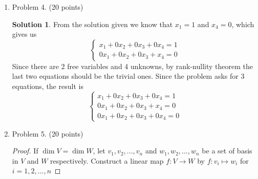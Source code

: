 \documentclass[]{book}
\theoremstyle{definition}
\newtheorem*{soln}{Solution}
\newcommand{\0}{\mathbf{0}}
\begin{document}
\begin{enumerate}
\item Problem 4. (20 points)
\begin{soln}
From the solution given we know that $x_1=1$ and $x_4=0$, which gives us
\begin{equation*}
\begin{cases}
x_1+0x_2+0x_3+0x_4=1\\
0x_1+0x_2+0x_3+x_4=0
\end{cases}
\end{equation*}
Since there are 2 free variables and 4 unknowns, by rank-nullity theorem the last two equations should be the trivial ones. Since the problem asks for 3 equations, the result is
\begin{equation*}
\begin{cases}
x_1+0x_2+0x_3+0x_4=1\\
0x_1+0x_2+0x_3+x_4=0\\
0x_1+0x_2+0x_3+0x_4=0
\end{cases}
\end{equation*}
\end{soln}

\item Problem 5. (20 points)
\begin{proof}
If $\dim V=\dim W$, let $v_1,v_2,...,v_n$ and $w_1,w_2,...,w_n$ be a set of basis in $V$ and $W$ respectively. Construct a linear map $f:V\to W$ by $f:v_i\mapsto w_i$ for $i=1,2,...,n$
\end{proof}


\end{enumerate}
\end{document}
